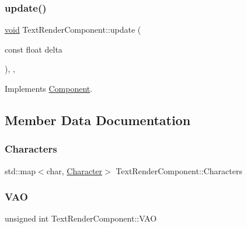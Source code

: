 \mbox{\label{classTextRenderComponent_a73c53ed27b94597551536fda5775fb49}} 
\subsubsection{\texorpdfstring{update()}{update()}}
{\footnotesize\ttfamily \hyperlink{imgui__impl__opengl3__loader_8h_ac668e7cffd9e2e9cfee428b9b2f34fa7}{void} Text\+Render\+Component\+::update (\begin{DoxyParamCaption}\item[{const float}]{delta }\end{DoxyParamCaption})\hspace{0.3cm}{\ttfamily [inline]}, {\ttfamily [override]}, {\ttfamily [virtual]}}



Implements \hyperlink{classComponent_a3448977e6f464df89e77dda7c6f52204}{Component}.



\subsection{Member Data Documentation}
\mbox{\label{classTextRenderComponent_a96cfcacedd8e2dc8d39055b2e75c4376}} 
\subsubsection{\texorpdfstring{Characters}{Characters}}
{\footnotesize\ttfamily std\+::map$<$char, \hyperlink{structCharacter}{Character}$>$ Text\+Render\+Component\+::\+Characters}

\mbox{\label{classTextRenderComponent_a04eb58b08e5bdc1d16d80cdc5eed5d9b}} 
\subsubsection{\texorpdfstring{V\+AO}{VAO}}
{\footnotesize\ttfamily unsigned int Text\+Render\+Component\+::\+V\+AO\hspace{0.3cm}{\ttfamily [private]}}

